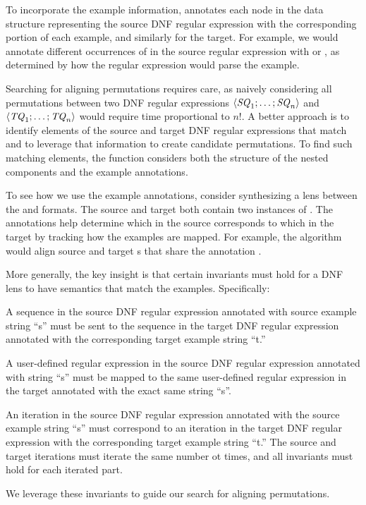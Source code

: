 \documentclass[numbers,10pt,preprint\ifanon ,nocopyrightspace\fi]{sigplanconf}
\begin{document}
To incorporate the example information, \SynthRWLDNFLens{} annotates each
node in the data structure representing the source DNF regular
expression with the corresponding portion of each example, and
similarly for the target.  For example, we would annotate
different occurrences of  in the source 
regular expression with  or , as
determined by how the regular expression would parse the example. 

Searching for aligning permutations requires care, as naively
considering all permutations between two DNF regular
expressions $\langle\mathit{SQ}_1;\ldots;\mathit{SQ}_n\rangle$ and
$\langle\mathit{TQ}_1;\ldots;\mathit{TQ}_n\rangle$ would require time
proportional to $n!$.  A better approach is to identify elements of
the source and target DNF regular expressions that match and to
leverage that information to create candidate permutations.  To find
such matching elements, the function considers both the structure of
the nested components and the example annotations.  

To see how we use the example annotations, consider synthesizing a
lens between the  and  formats.  The source
and target both contain two instances of .  The annotations
help determine which  in the source corresponds to
which  in the target by tracking how the examples are mapped.
For example, the algorithm would align source and target s
that share the annotation .

More generally, the key insight is that certain invariants must hold
for a DNF lens to have semantics that match the examples. Specifically:
\begin{enumerate*}[label=(\arabic*) ]
\item A sequence in the source DNF regular expression annotated with
  source example string ``s'' must be sent to the sequence in the
  target DNF regular expression annotated with the corresponding
  target example string ``t.''

\item A user-defined regular expression in the source DNF regular
  expression annotated with string ``s'' must be mapped to the same
  user-defined regular expression in the target annotated
  with the exact same string ``s''. 

\item An iteration in the source DNF regular expression annotated with
  the source example string ``s'' must correspond to an iteration in
  the target DNF regular expression with the corresponding target
  example string ``t.''  The source and target iterations must iterate
  the same number ot times, and all invariants must hold for each
  iterated part.
\end{enumerate*}
We leverage these invariants to guide our search for aligning permutations.
\end{document}
